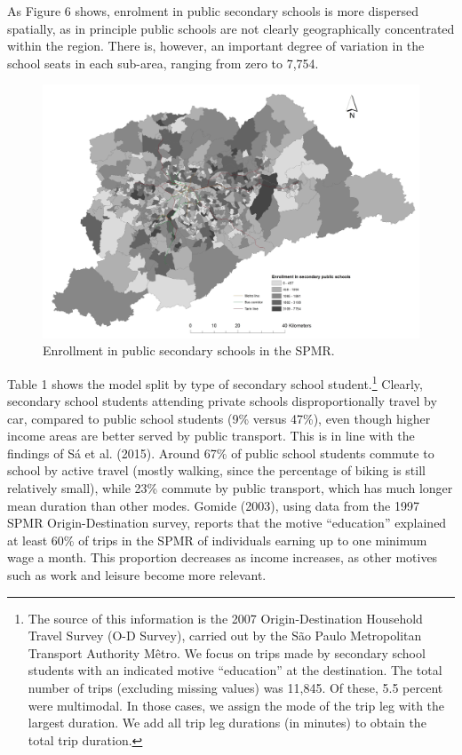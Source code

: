 \documentclass[]{article}
\let\rmarkdownfootnote\footnote%
\def\footnote{\protect\rmarkdownfootnote}
\begin{document}
As Figure 6 shows, enrolment in public secondary schools is more
dispersed spatially, as in principle public schools are not clearly
geographically concentrated within the region. There is, however, an
important degree of variation in the school seats in each sub-area,
ranging from zero to 7,754.
\begin{figure}
\includegraphics[width=0.7\linewidth]{enrol} \caption{Enrollment in public secondary schools in the SPMR.}\label{fig:unnamed-chunk-7}
\end{figure}
Table 1 shows the model split by type of secondary school
student.\footnote{The source of this information is the 2007
  Origin-Destination Household Travel Survey (O-D Survey), carried out
  by the São Paulo Metropolitan Transport Authority Mêtro. We focus on
  trips made by secondary school students with an indicated motive
  ``education'' at the destination. The total number of trips (excluding
  missing values) was 11,845. Of these, 5.5 percent were multimodal. In
  those cases, we assign the mode of the trip leg with the largest
  duration. We add all trip leg durations (in minutes) to obtain the
  total trip duration.} Clearly, secondary school students attending
private schools disproportionally travel by car, compared to public
school students (9\% versus 47\%), even though higher income areas are
better served by public transport. This is in line with the findings of
S{á} et al. (2015). Around 67\% of public school students commute to
school by active travel (mostly walking, since the percentage of biking
is still relatively small), while 23\% commute by public transport,
which has much longer mean duration than other modes. Gomide (2003),
using data from the 1997 SPMR Origin-Destination survey, reports that
the motive ``education'' explained at least 60\% of trips in the SPMR of
individuals earning up to one minimum wage a month. This proportion
decreases as income increases, as other motives such as work and
leisure become more relevant.
\end{document}
